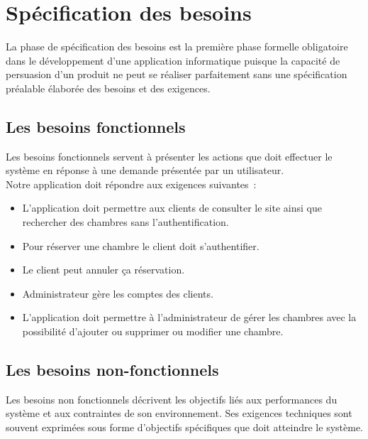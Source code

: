 \documentclass[12pt]{report}
\begin{document}
\newpage

\vspace*{-0.62in}
\section{Spécification des besoins}
\hspace*{0.16in}
La phase de spécification des besoins est la première phase formelle obligatoire dans le développement d’une application informatique puisque la capacité de persuasion d’un produit ne peut se réaliser parfaitement sans une spécification préalable élaborée des besoins et des exigences.

\subsection{Les besoins fonctionnels}
\hspace*{0.16in}
Les besoins fonctionnels servent à présenter les actions que doit effectuer le système en réponse à une demande présentée par un utilisateur.
\\
Notre application doit répondre aux exigences suivantes :

\begin{itemize}
    \item L’application doit permettre aux clients de consulter le site ainsi que rechercher des chambres sans l’authentification.
    \item Pour réserver une chambre le client doit s’authentifier.
    \item Le client peut annuler ça réservation.
    \item Administrateur gère les comptes des clients.
    \item L’application doit permettre à l'administrateur de gérer les chambres avec la possibilité d’ajouter ou supprimer ou modifier une chambre.
\end{itemize}

\subsection{Les besoins non-fonctionnels}
\hspace*{0.16in}
Les besoins non fonctionnels décrivent les objectifs liés aux performances du système et aux contraintes de son environnement. Ses exigences techniques sont souvent exprimées sous forme d’objectifs spécifiques que doit atteindre le système.
\end{document}

